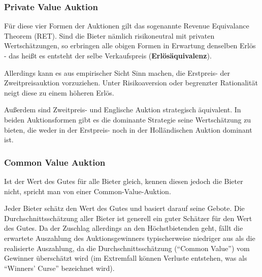 \subsubsection*{Private Value Auktion}

Für diese vier Formen der Auktionen gilt das sogenannte Revenue Equivalance Theorem (RET). Sind die Bieter nämlich risikoneutral mit privaten Wertschätzungen, so erbringen alle obigen Formen in Erwartung denselben Erlös - das heißt es entsteht der selbe Verkaufspreis (\textbf{Erlösäquivalenz}). ~\bigskip

Allerdings kann es aus empirischer Sicht Sinn machen, die Erstpreis- der Zweitpreisauktion vorzuziehen. Unter Risikoaversion oder begrenzter Rationalität neigt diese zu einem höheren Erlös. ~\bigskip

Außerdem sind Zweitpreis- und Englische Auktion strategisch äquivalent. In beiden Auktionsformen gibt es die dominante Strategie seine Wertschätzung zu bieten, die weder in der Erstpreis- noch in der Holländischen Auktion dominant ist.

\subsubsection*{Common Value Auktion}
 
 Ist der Wert des Gutes für alle Bieter gleich, kennen diesen jedoch die Bieter nicht, spricht man von einer Common-Value-Auktion. ~\bigskip
 
 Jeder Bieter schätz den Wert des Gutes und basiert darauf seine Gebote. Die Durchschnittsschätzung aller Bieter ist generell ein guter Schätzer für den Wert des Gutes. Da der Zuschlag allerdings an den Höchstbietenden geht, fällt die erwartete Auszahlung des Auktionsgewinners typischerweise niedriger aus als die realisierte Auszahlung, da die Durchschnittsschätzung (\enquote{Common Value}) vom Gewinner überschätzt wird (im Extremfall können Verluste entstehen, was als \enquote{Winners' Curse} bezeichnet wird).